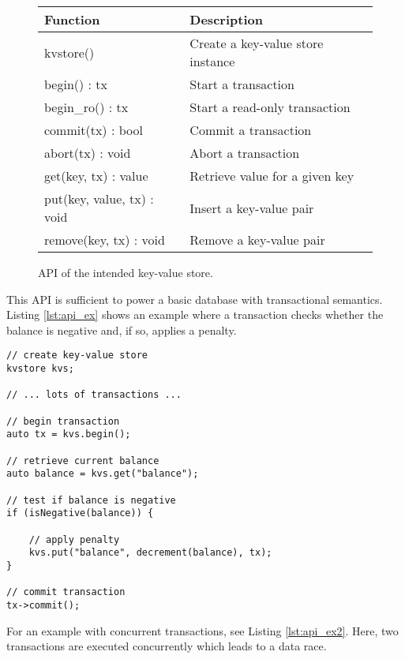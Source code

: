 \begin{figure}[!h]
    \centering
    \begin{tabular}{|l|l|}
        \hline
        \textbf{Function}          & \textbf{Description} \\
        \hline
        kvstore()                  & Create a key-value store instance \\
        begin() : tx               & Start a transaction \\
        begin\_ro() : tx            & Start a read-only transaction \\
        commit(tx) : bool          & Commit a transaction \\
        abort(tx) : void           & Abort a transaction \\
        get(key, tx) : value       & Retrieve value for a given key \\
        put(key, value, tx) : void & Insert a key-value pair \\
        remove(key, tx) : void     & Remove a key-value pair \\
        \hline
    \end{tabular}
    \caption{API of the intended key-value store.}
    \label{tab:api}
\end{figure}

This API is sufficient to power a basic database with transactional semantics.
Listing \ref{lst:api_ex} shows an example where a transaction checks whether the
balance is negative and, if so, applies a penalty.

\begin{lstlisting}
// create key-value store
kvstore kvs;

// ... lots of transactions ...

// begin transaction
auto tx = kvs.begin();

// retrieve current balance
auto balance = kvs.get("balance");

// test if balance is negative
if (isNegative(balance)) {

	// apply penalty
	kvs.put("balance", decrement(balance), tx);
}

// commit transaction
tx->commit();
\end{lstlisting}\label{lst:api_ex}

For an example with concurrent transactions, see Listing \ref{lst:api_ex2}.
Here, two transactions are executed concurrently which leads to a data race.

